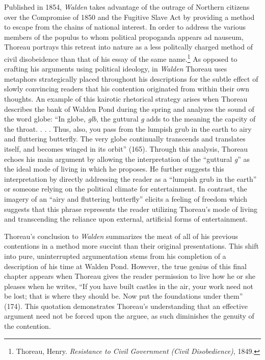\documentclass[12pt]{article}
\newcommand{\tq}[2]{
    \fancyhead[L]{\emph{Walden}: Reading Journals}
    \fancyhead[R]{TQ:\ #1 $\vert$ CH: #2}
}
\begin{document}
Published in 1854, \emph{Walden} takes advantage of the outrage of Northern citizens over the Compromise of 1850 and the Fugitive Slave Act by providing a method to escape from the chains of national interest. In order to address the various members of the populus to whom political propoganda appears ad nauseum, Thoreau portrays this retreat into nature as a less politcally charged method of civil disobeidence than that of his essay of the same name.\footnote{Thoreau, Henry. \emph{Resistance to Civil Government (Civil Disobedience)}, 1849.} As opposed to crafting his arguments using political ideology, in \emph{Walden} Thoreau uses metaphors strategically placed throughout his descriptions for the subtle effect of slowly convincing readers that his contention originated from within their own thoughts. An example of this kairotic rhetorical strategy arises when Thoreau describes the bank of Walden Pond during the spring and analyzes the sound of the word globe: ``In globe, \emph{glb}, the guttural \emph{g} adds to the meaning the capcity of the throat. . . . Thus, also, you pass from the lumpish grub in the earth to airy and fluttering butterfly. The very globe continually transcends and translates itself, and becomes winged in its orbit'' (165). Through this analysis, Thoreau echoes his main argument by allowing the interpretation of the ``guttural \emph{g}'' as the ideal mode of living in which he proposes. He further suggests this interpretation by directly addressing the reader as a ``lumpish grub in the earth'' or someone relying on the political climate for entertainment. In contrast, the imagery of an ``airy and fluttering butterfly'' elicits a feeling of freedom which suggests that this phrase represents the reader utilizing Thoreau's mode of living and transcending the reliance upon external, artificial forms of entertainment.

\newpage
\tq{15}{18 - Conclusion}


Thoreau's conclusion to \emph{Walden} summarizes the meat of all of his previous contentions in a method more succint than their original presentations. This shift into pure, uninterrupted argumentation stems from his completion of a description of his time at Walden Pond. However, the true genius of this final chapter appears when Thoreau gives the reader permission to live how he or she pleases when he writes, ``If you have built castles in the air, your work need not be lost; that is where they should be. Now put the foundations under them'' (174). This quotation demonstrates Thoreau's understanding that an effective argument need not be forced upon the arguee, as such diminishes the genuity of the contention.
\end{document}
